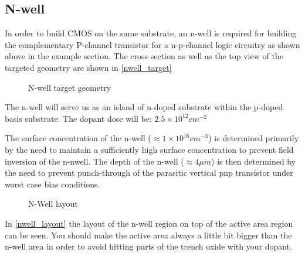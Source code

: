 \subsection{N-well}\label{nwell_chapter}
In order to build CMOS on the same substrate, an n-well is required for building the complementary P-channel transistor for a n-p-channel logic circuitry as shown above in the example section.
The cross section as well as the top view of the targeted geometry are shown in \autoref{nwell_target}
\begin{figure}[H]
	\centering
	\begin{tikzpicture}[node distance = 3cm, auto, thick,scale=\CrossAndTopSectionBig, every node/.style={transform shape}]
		
	\end{tikzpicture}
	\begin{tikzpicture}[node distance = 3cm, auto, thick,scale=\CrossAndTopSectionBig, every node/.style={transform shape}]
		
	\end{tikzpicture}
	\caption{N-well target geometry}
	\label{nwell_target}
\end{figure}
The n-well will serve us as an island of n-doped substrate within the p-doped basis substrate.
The dopant dose will be: $2.5\times10^{12}cm^{-2}$

The surface concentration of the n-well ($\approx 1 \times 10^{16} cm^{-3}$) is determined primarily by the need to maintain a sufficiently high surface concentration to prevent field inversion of the n-nwell.
The depth of the n-well ($\approx 4 \mu m$) is then determined by the need to prevent punch-through of the parasitic vertical pnp transistor under worst case bias conditions.

\begin{figure}[H]
	\centering
	\begin{tikzpicture}[node distance =1cm, auto, thick,scale=\VLSILayout, every node/.style={transform shape}]
		
	\end{tikzpicture}
	\caption{N-Well layout}
	\label{nwell_layout}
\end{figure}

In \autoref{nwell_layout} the layout of the n-well region on top of the active area region can be seen.
You should make the active area always a little bit bigger than the n-well area in order to avoid hitting parts of the trench oxide with your dopant.

\newpage

